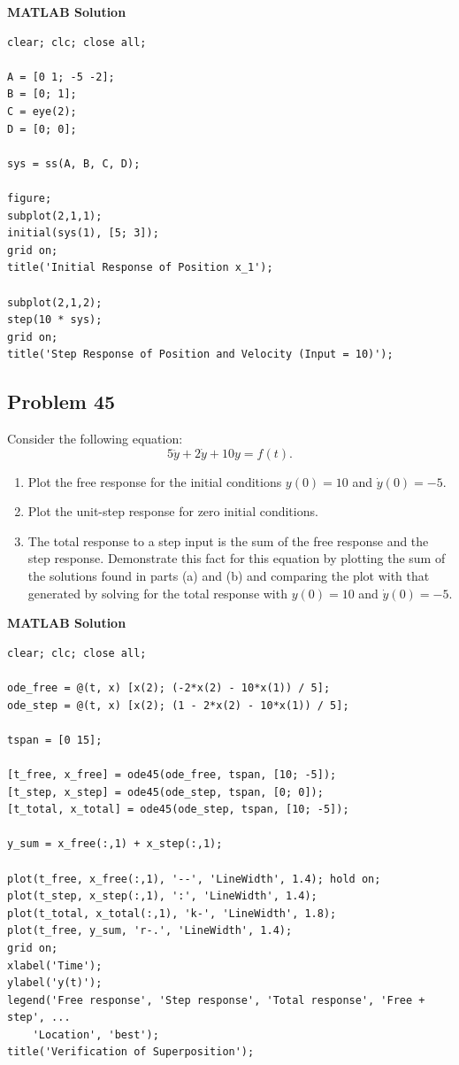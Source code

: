 \documentclass[12pt]{article}
\newcommand{\questiontitle}[2]{%
    \phantomsection
    \hypertarget{#1}{}%
    \subsection*{#2}
}
\newcommand{\solutiontitle}{\noindent\textbf{MATLAB Solution}}
\begin{document}
\solutiontitle
\begin{lstlisting}
clear; clc; close all;

A = [0 1; -5 -2];
B = [0; 1];
C = eye(2);
D = [0; 0];

sys = ss(A, B, C, D);

figure;
subplot(2,1,1);
initial(sys(1), [5; 3]);
grid on;
title('Initial Response of Position x_1');

subplot(2,1,2);
step(10 * sys);
grid on;
title('Step Response of Position and Velocity (Input = 10)');
\end{lstlisting}

\questiontitle{tut9-q45}{Problem 45}
Consider the following equation:
\[
5\ddot{y} + 2\dot{y} + 10y = f(t).
\]
\begin{enumerate}[label=\alph*.]
    \item Plot the free response for the initial conditions $y(0) = 10$ and $\dot{y}(0) = -5$.
    \item Plot the unit-step response for zero initial conditions.
    \item The total response to a step input is the sum of the free response and the step response. Demonstrate this fact for this equation by plotting the sum of the solutions found in parts (a) and (b) and comparing the plot with that generated by solving for the total response with $y(0) = 10$ and $\dot{y}(0) = -5$.
\end{enumerate}

\solutiontitle
\begin{lstlisting}
clear; clc; close all;

ode_free = @(t, x) [x(2); (-2*x(2) - 10*x(1)) / 5];
ode_step = @(t, x) [x(2); (1 - 2*x(2) - 10*x(1)) / 5];

tspan = [0 15];

[t_free, x_free] = ode45(ode_free, tspan, [10; -5]);
[t_step, x_step] = ode45(ode_step, tspan, [0; 0]);
[t_total, x_total] = ode45(ode_step, tspan, [10; -5]);

y_sum = x_free(:,1) + x_step(:,1);

plot(t_free, x_free(:,1), '--', 'LineWidth', 1.4); hold on;
plot(t_step, x_step(:,1), ':', 'LineWidth', 1.4);
plot(t_total, x_total(:,1), 'k-', 'LineWidth', 1.8);
plot(t_free, y_sum, 'r-.', 'LineWidth', 1.4);
grid on;
xlabel('Time');
ylabel('y(t)');
legend('Free response', 'Step response', 'Total response', 'Free + step', ...
    'Location', 'best');
title('Verification of Superposition');
\end{lstlisting}
\end{document}
